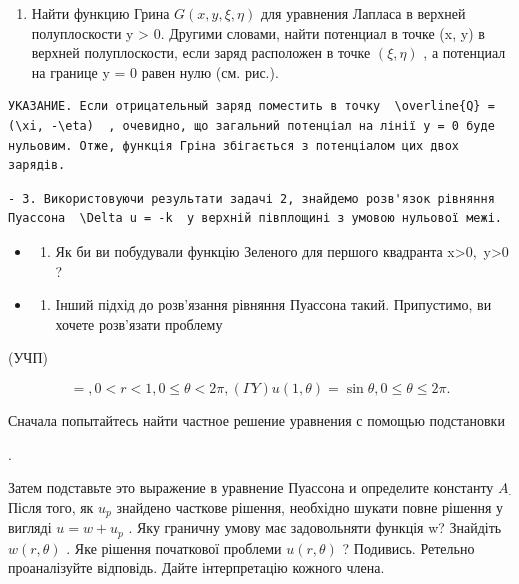 \documentclass[
  ukrainian,
]{article}
\providecommand{\tightlist}{%
  \setlength{\itemsep}{0pt}\setlength{\parskip}{0pt}}
\begin{document}
\begin{enumerate}
\def\labelenumi{\arabic{enumi}.}
\setcounter{enumi}{1}
\tightlist
\item
  Найти функцию Грина \(G(x, y, \xi, \eta)\) для уравнения Лапласа в
  верхней полуплоскости y \textgreater{} 0. Другими словами, найти
  потенциал в точке (x, y) в верхней полуплоскости, если заряд
  расположен в точке \((\xi, \eta)\) , а потенциал на границе y = 0
  равен нулю (см. рис.).
\end{enumerate}

\begin{verbatim}
УКАЗАНИЕ. Если отрицательный заряд поместить в точку  \overline{Q} = (\xi, -\eta)  , очевидно, що загальний потенціал на лінії y = 0 буде нульовим. Отже, функція Гріна збігається з потенціалом цих двох зарядів.
\end{verbatim}

\begin{verbatim}
- 3. Використовуючи результати задачі 2, знайдемо розв'язок рівняння Пуассона  \Delta u = -k  у верхній півплощині з умовою нульової межі.
\end{verbatim}

\begin{itemize}
\tightlist
\item
  \begin{enumerate}
  \def\labelenumi{\arabic{enumi}.}
  \setcounter{enumi}{3}
  \tightlist
  \item
    Як би ви побудували функцію Зеленого для першого квадранта
    x\textgreater0,~y\textgreater0 ?
  \end{enumerate}
\item
  \begin{enumerate}
  \def\labelenumi{\arabic{enumi}.}
  \setcounter{enumi}{4}
  \tightlist
  \item
    Інший підхід до розв'язання рівняння Пуассона такий. Припустимо, ви
    хочете розв'язати проблему
  \end{enumerate}
\end{itemize}

(УЧП)

\[
=
,  0 < r < 1  ,  0 \le \theta < 2\pi  ,  (\Gamma Y)   u(1, \theta) = \sin \theta  ,  0 \le \theta \le 2\pi  .
\]

Сначала попытайтесь найти частное решение уравнения с помощью
подстановки

.

Затем подставьте это выражение в уравнение Пуассона и определите
константу \(A_{\cdot}\) Після того, як \(u_p\) знайдено часткове
рішення, необхідно шукати повне рішення у вигляді \(u=w+u_p\) . Яку
граничну умову має задовольняти функція w? Знайдіть \(w(r, \theta)\) .
Яке рішення початкової проблеми \(u(r, \theta)\) ? Подивись. Ретельно
проаналізуйте відповідь. Дайте інтерпретацію кожного члена.
\end{document}
